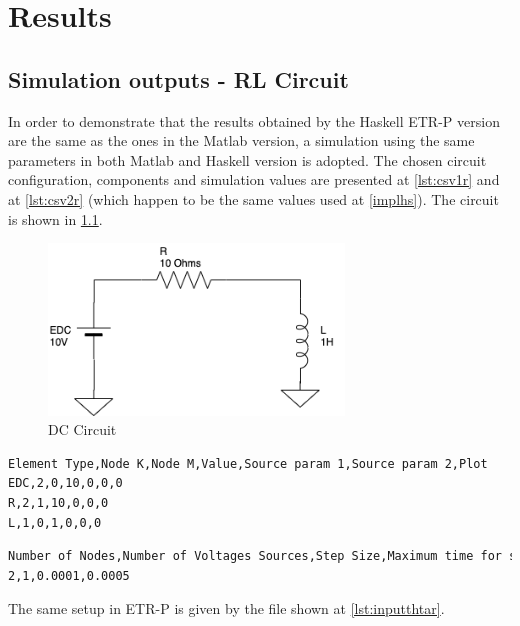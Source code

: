 \chapter{ Results }
\label{results}


\section{Simulation outputs - RL Circuit}


In order to demonstrate that the results obtained by the Haskell ETR-P version are the same as the ones in the Matlab version, a simulation using the same parameters in both Matlab and Haskell version is adopted. The chosen circuit configuration, components and simulation values are presented at \cref{lst:csv1r} and at \cref{lst:csv2r} (which happen to be the same values used at \cref{implhs}). The circuit is shown in \cref{thesissim1}.

\begin{figure}[H]
   \centering
   \includegraphics[width=0.7\textwidth]{img/thesissim1.png}
   \caption{DC Circuit}
   \label{thesissim1}
\end{figure}

\begin{lstlisting}[language=bash, label=getinfo, caption={Input data file for components in the Haskell implementation}, captionpos=b, label={lst:csv1r}]
Element Type,Node K,Node M,Value,Source param 1,Source param 2,Plot
EDC,2,0,10,0,0,0 
R,2,1,10,0,0,0
L,1,0,1,0,0,0
\end{lstlisting}


\begin{lstlisting}[language=bash, label=getinfo, caption={Input data file for time}, captionpos=b, label={lst:csv2r}]
Number of Nodes,Number of Voltages Sources,Step Size,Maximum time for simulation
2,1,0.0001,0.0005
\end{lstlisting}

The same setup in ETR-P is given by the file shown at \cref{lst:inputthtar}.

